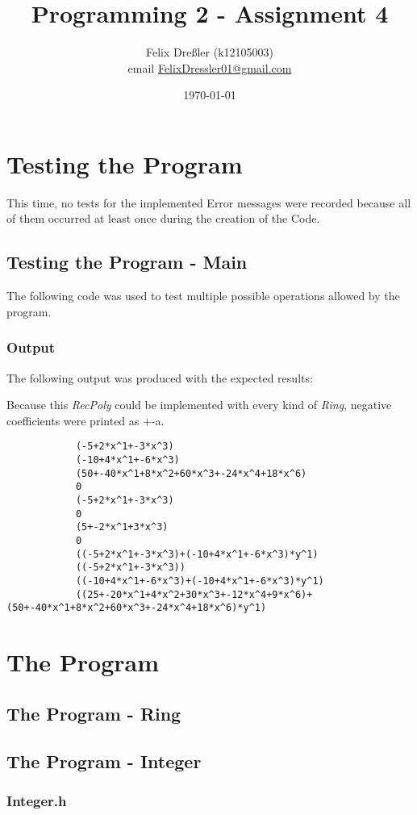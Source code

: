 \documentclass[11pt,titlepage]{article}
\title{Programming 2 - Assignment 4}
\author{Felix Dreßler (k12105003)\\ email \href{mailto:FelixDressler01@gmail.com}{FelixDressler01@gmail.com}}
\date{\today} %
\begin{document}
\maketitle
	\section{Testing the Program}
	This time, no tests for the implemented Error messages were recorded because all of them occurred at least once during the creation of the Code.
		\subsection{Testing the Program - Main}
		The following code was used to test multiple possible operations allowed by the program.
			
		
		\subsubsection{Output}
		The following output was produced with the expected results:
		
		Because this \emph{RecPoly} could be implemented with every kind of \emph{Ring}, negative coefficients were printed as +-a.
		
		\begin{lstlisting}
			(-5+2*x^1+-3*x^3)
			(-10+4*x^1+-6*x^3)
			(50+-40*x^1+8*x^2+60*x^3+-24*x^4+18*x^6)
			0
			(-5+2*x^1+-3*x^3)
			0
			(5+-2*x^1+3*x^3)
			0
			((-5+2*x^1+-3*x^3)+(-10+4*x^1+-6*x^3)*y^1)
			((-5+2*x^1+-3*x^3))
			((-10+4*x^1+-6*x^3)+(-10+4*x^1+-6*x^3)*y^1)
			((25+-20*x^1+4*x^2+30*x^3+-12*x^4+9*x^6)+(50+-40*x^1+8*x^2+60*x^3+-24*x^4+18*x^6)*y^1)
		\end{lstlisting}

\newpage
	\section{The Program}
		\subsection{The Program - Ring}
				
	
\newpage	
		\subsection{The Program - Integer}
			\subsubsection{Integer.h}
				
\end{document}
